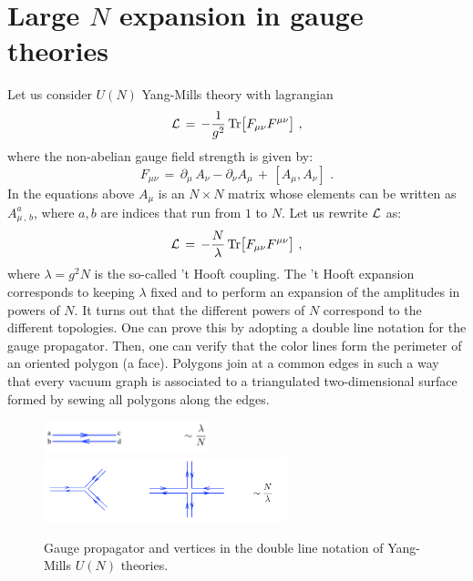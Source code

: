 \documentclass[12pt,notitlepage]{article}
\newcommand{\beq}{\begin{equation}}
\newcommand{\eeq}{\end{equation}}
\begin{document}
\section{Large $N$ expansion in gauge theories}
Let us consider $U(N)$  Yang-Mills theory with lagrangian
\beq
{\cal L}\,=\,-{1\over g^2}\,{\rm Tr}\big[ F_{\mu\nu} F^{\mu\nu}\big]\,\,,
\eeq
where the non-abelian gauge field strength is given by:
\beq
F_{\mu\nu}\,=\,\partial_{\mu}\,A_{\nu}-\partial_{\nu} A_{\mu}\,+\,
[A_{\mu}, A_{\nu}]\,\,.
\eeq
In the equations above $A_{\mu}$ is an $N\times N$ matrix whose elements can be written as $A_{\mu\,,\,b}^{a}$, where $a,b$ are indices that run from $1$ to $N$. Let us rewrite ${\cal L}$ as:
\beq
{\cal L}\,=\,-{N\over \lambda}\,{\rm Tr}\big[ F_{\mu\nu} F^{\mu\nu}\big]\,\,,
\eeq
where $\lambda=g^2 N$ is the so-called 't Hooft coupling. The  't Hooft  expansion \cite{tHooft:1973jz} corresponds to keeping $\lambda$ fixed and to perform an expansion of the amplitudes in powers of $N$. It turns out that the different powers of $N$ correspond to the different topologies. One can prove this by
adopting a double line notation for the gauge propagator. Then, one can verify that 
the color lines form the perimeter of an oriented polygon (a face). 
Polygons join at  a common edges in such a way that every vacuum 
graph is associated to a  triangulated two-dimensional surface formed by sewing all polygons along the edges. 

\begin{figure}[ht]
\center
\includegraphics[width=0.43\textwidth]{gauge_propagator.pdf}
\qquad\qquad
\includegraphics[width=0.63\textwidth]{YMvertices.pdf}
\caption{Gauge propagator and vertices in the double line notation of Yang-Mills  $U(N)$ theories. } 
\label{largeNYM.pdf}
\end{figure}
\end{document}

